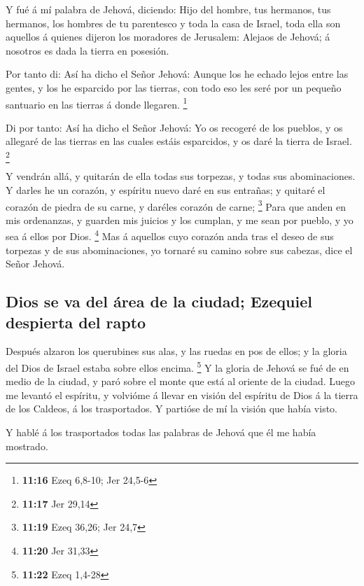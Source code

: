  Y fué á mí palabra de Jehová, diciendo: 
Hijo del hombre, tus hermanos, tus hermanos, los hombres de tu
parentesco y toda la casa de Israel, toda ella son aquellos á quienes
dijeron los moradores de Jerusalem: Alejaos de Jehová; á nosotros es
dada la tierra en posesión.

 Por tanto di: Así ha dicho el Señor Jehová: Aunque los
he echado lejos entre las gentes, y los he esparcido por las tierras,
con todo eso les seré por un pequeño santuario en las tierras á donde
llegaren. \footnote{\textbf{11:16} Ezeq 6,8-10; Jer 24,5-6}

 Di por tanto: Así ha dicho el Señor Jehová: Yo os
recogeré de los pueblos, y os allegaré de las tierras en las cuales
estáis esparcidos, y os daré la tierra de Israel. \footnote{\textbf{11:17}
  Jer 29,14}

 Y vendrán allá, y quitarán de ella todas sus torpezas, y
todas sus abominaciones.  Y darles he un corazón, y
espíritu nuevo daré en sus entrañas; y quitaré el corazón de piedra de
su carne, y daréles corazón de carne; \footnote{\textbf{11:19} Ezeq
  36,26; Jer 24,7}  Para que anden en mis ordenanzas, y
guarden mis juicios y los cumplan, y me sean por pueblo, y yo sea á
ellos por Dios. \footnote{\textbf{11:20} Jer 31,33}  Mas
á aquellos cuyo corazón anda tras el deseo de sus torpezas y de sus
abominaciones, yo tornaré su camino sobre sus cabezas, dice el Señor
Jehová.

\hypertarget{dios-se-va-del-uxe1rea-de-la-ciudad-ezequiel-despierta-del-rapto}{%
\subsection{Dios se va del área de la ciudad; Ezequiel despierta del
rapto}\label{dios-se-va-del-uxe1rea-de-la-ciudad-ezequiel-despierta-del-rapto}}

 Después alzaron los querubines sus alas, y las ruedas en
pos de ellos; y la gloria del Dios de Israel estaba sobre ellos encima.
\footnote{\textbf{11:22} Ezeq 1,4-28}  Y la gloria de
Jehová se fué de en medio de la ciudad, y paró sobre el monte que está
al oriente de la ciudad.  Luego me levantó el espíritu, y
volvióme á llevar en visión del espíritu de Dios á la tierra de los
Caldeos, á los trasportados. Y partióse de mí la visión que había visto.

 Y hablé á los trasportados todas las palabras de Jehová
que él me había mostrado.

